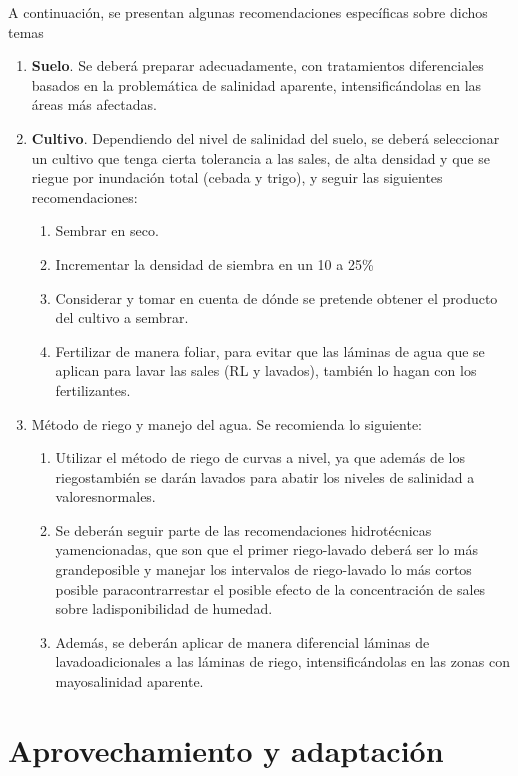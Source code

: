 A continuación, se presentan algunas recomendaciones específicas sobre dichos temas
\begin{enumerate}
    \item \textbf{Suelo}. Se deberá preparar adecuadamente, con tratamientos diferenciales basados en la problemática de salinidad aparente, intensificándolas en las áreas más afectadas.
    \item \textbf{Cultivo}. Dependiendo del nivel de salinidad del suelo, se deberá seleccionar un cultivo que tenga cierta tolerancia a las sales, de alta densidad y que se riegue por inundación total (cebada y trigo), y seguir las siguientes recomendaciones:
    \begin{enumerate}
        \item Sembrar en seco.
        \item Incrementar la densidad de siembra en un 10 a 25\%
        \item Considerar y tomar en cuenta de dónde se pretende obtener el producto del cultivo a sembrar.
        \item Fertilizar de manera foliar, para evitar que las láminas de agua que se aplican para lavar las sales (RL y lavados), también lo hagan con los fertilizantes.
    \end{enumerate}
    \item Método de riego y manejo del agua. Se recomienda lo siguiente:
    \begin{enumerate}
        \item Utilizar el método de riego de curvas a nivel, ya que además de los riegostambién se darán lavados para abatir los niveles de salinidad a valoresnormales.
        \item Se deberán seguir parte de las recomendaciones hidrotécnicas yamencionadas, que son que el primer riego-lavado deberá ser lo más grandeposible y manejar los intervalos de riego-lavado lo más cortos posible paracontrarrestar el posible efecto de la concentración de sales sobre ladisponibilidad de humedad.
        \item Además, se deberán aplicar de manera diferencial láminas de lavadoadicionales a las láminas de riego, intensificándolas en las zonas con mayosalinidad aparente.
    \end{enumerate}
\end{enumerate}
\section{Aprovechamiento y adaptación}


